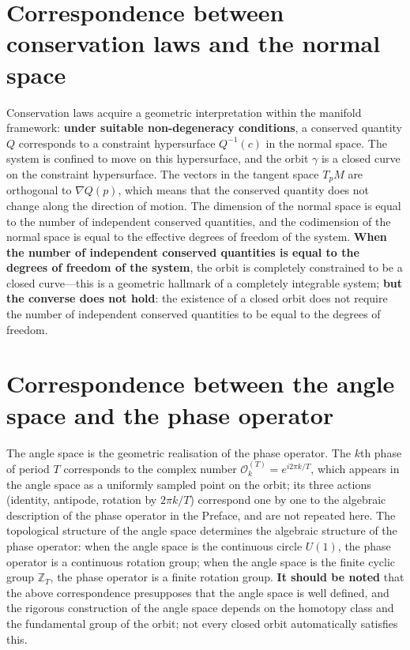 \section*{Correspondence between conservation laws and the normal space}

Conservation laws acquire a geometric interpretation within the manifold framework: \textbf{under suitable non-degeneracy conditions}, a conserved quantity $Q$ corresponds to a constraint hypersurface $Q^{-1}(c)$ in the normal space. The system is confined to move on this hypersurface, and the orbit $\gamma$ is a closed curve on the constraint hypersurface. The vectors in the tangent space $T_p M$ are orthogonal to $\nabla Q(p)$, which means that the conserved quantity does not change along the direction of motion. The dimension of the normal space is equal to the number of independent conserved quantities, and the codimension of the normal space is equal to the effective degrees of freedom of the system. \textbf{When the number of independent conserved quantities is equal to the degrees of freedom of the system}, the orbit is completely constrained to be a closed curve---this is a geometric hallmark of a completely integrable system; \textbf{but the converse does not hold}: the existence of a closed orbit does not require the number of independent conserved quantities to be equal to the degrees of freedom.

\section*{Correspondence between the angle space and the phase operator}

The angle space is the geometric realisation of the phase operator. The $k$th phase of period $T$ corresponds to the complex number $\mathcal{O}_k^{(T)} = e^{i2\pi k/T}$, which appears in the angle space as a uniformly sampled point on the orbit; its three actions (identity, antipode, rotation by $2\pi k/T$) correspond one by one to the algebraic description of the phase operator in the Preface, and are not repeated here. The topological structure of the angle space determines the algebraic structure of the phase operator: when the angle space is the continuous circle $U(1)$, the phase operator is a continuous rotation group; when the angle space is the finite cyclic group $\mathbb{Z}_T$, the phase operator is a finite rotation group. \textbf{It should be noted} that the above correspondence presupposes that the angle space is well defined, and the rigorous construction of the angle space depends on the homotopy class and the fundamental group of the orbit; not every closed orbit automatically satisfies this.

